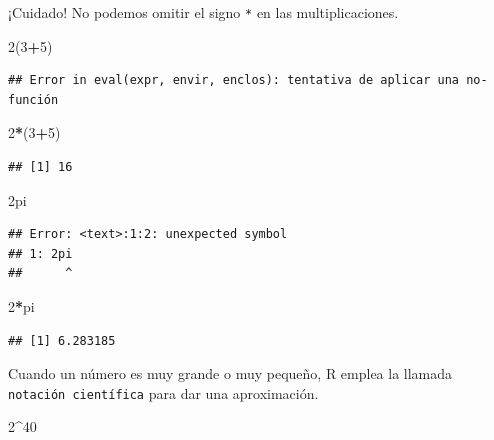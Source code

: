 \documentclass[]{book}
\newenvironment{Shaded}{\begin{snugshade}}{\end{snugshade}}
\newcommand{\DecValTok}[1]{\textcolor[rgb]{0.00,0.00,0.81}{#1}}
\newcommand{\NormalTok}[1]{#1}
\newcommand{\OperatorTok}[1]{\textcolor[rgb]{0.81,0.36,0.00}{\textbf{#1}}}
\theoremstyle{definition}
\theoremstyle{definition}
\theoremstyle{definition}
\theoremstyle{remark}
\begin{document}
¡Cuidado! No podemos omitir el signo \texttt{*} en las multiplicaciones.

\begin{Shaded}
\begin{Highlighting}[]
\DecValTok{2}\NormalTok{(}\DecValTok{3}\OperatorTok{+}\DecValTok{5}\NormalTok{)}
\end{Highlighting}
\end{Shaded}

\begin{verbatim}
## Error in eval(expr, envir, enclos): tentativa de aplicar una no-función
\end{verbatim}

\begin{Shaded}
\begin{Highlighting}[]
\DecValTok{2}\OperatorTok{*}\NormalTok{(}\DecValTok{3}\OperatorTok{+}\DecValTok{5}\NormalTok{)}
\end{Highlighting}
\end{Shaded}

\begin{verbatim}
## [1] 16
\end{verbatim}

\begin{Shaded}
\begin{Highlighting}[]
\NormalTok{2pi}
\end{Highlighting}
\end{Shaded}

\begin{verbatim}
## Error: <text>:1:2: unexpected symbol
## 1: 2pi
##      ^
\end{verbatim}

\begin{Shaded}
\begin{Highlighting}[]
\DecValTok{2}\OperatorTok{*}\NormalTok{pi}
\end{Highlighting}
\end{Shaded}

\begin{verbatim}
## [1] 6.283185
\end{verbatim}

Cuando un número es muy grande o muy pequeño, R emplea la llamada \texttt{notación\ científica} para dar una aproximación.

\begin{Shaded}
\begin{Highlighting}[]
\DecValTok{2}\OperatorTok{^}\DecValTok{40}
\end{Highlighting}
\end{Shaded}
\end{document}
